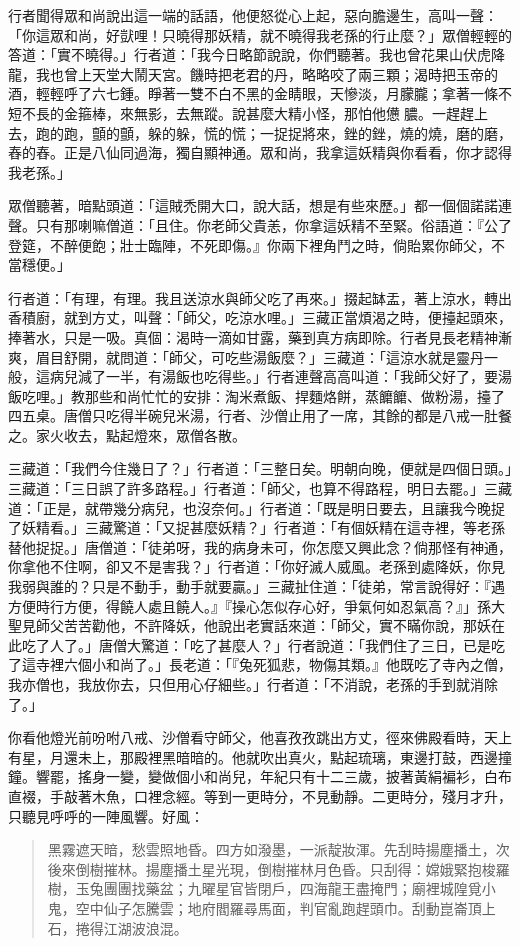 行者聞得眾和尚說出這一端的話語，他便怒從心上起，惡向膽邊生，高叫一聲：「你這眾和尚，好獃哩！只曉得那妖精，就不曉得我老孫的行止麼？」眾僧輕輕的答道：「實不曉得。」行者道：「我今日略節說說，你們聽著。我也曾花果山伏虎降龍，我也曾上天堂大鬧天宮。饑時把老君的丹，略略咬了兩三顆；渴時把玉帝的酒，輕輕呼了六七鍾。睜著一雙不白不黑的金睛眼，天慘淡，月朦朧；拿著一條不短不長的金箍棒，來無影，去無蹤。說甚麼大精小怪，那怕他憊𪬯膿。一趕趕上去，跑的跑，顫的顫，躲的躲，慌的慌；一捉捉將來，銼的銼，燒的燒，磨的磨，舂的舂。正是八仙同過海，獨自顯神通。眾和尚，我拿這妖精與你看看，你才認得我老孫。」

眾僧聽著，暗點頭道：「這賊禿開大口，說大話，想是有些來歷。」都一個個諾諾連聲。只有那喇嘛僧道：「且住。你老師父貴恙，你拿這妖精不至緊。俗語道：『公了登筵，不醉便飽；壯士臨陣，不死即傷。』你兩下裡角鬥之時，倘貽累你師父，不當穩便。」

行者道：「有理，有理。我且送涼水與師父吃了再來。」掇起缽盂，著上涼水，轉出香積廚，就到方丈，叫聲：「師父，吃涼水哩。」三藏正當煩渴之時，便擡起頭來，捧著水，只是一吸。真個：渴時一滴如甘露，藥到真方病即除。行者見長老精神漸爽，眉目舒開，就問道：「師父，可吃些湯飯麼？」三藏道：「這涼水就是靈丹一般，這病兒減了一半，有湯飯也吃得些。」行者連聲高高叫道：「我師父好了，要湯飯吃哩。」教那些和尚忙忙的安排：淘米煮飯、捍麵烙餅，蒸饝饝、做粉湯，擡了四五桌。唐僧只吃得半碗兒米湯，行者、沙僧止用了一席，其餘的都是八戒一肚餐之。家火收去，點起燈來，眾僧各散。

三藏道：「我們今住幾日了？」行者道：「三整日矣。明朝向晚，便就是四個日頭。」三藏道：「三日誤了許多路程。」行者道：「師父，也算不得路程，明日去罷。」三藏道：「正是，就帶幾分病兒，也沒奈何。」行者道：「既是明日要去，且讓我今晚捉了妖精看。」三藏驚道：「又捉甚麼妖精？」行者道：「有個妖精在這寺裡，等老孫替他捉捉。」唐僧道：「徒弟呀，我的病身未可，你怎麼又興此念？倘那怪有神通，你拿他不住啊，卻又不是害我？」行者道：「你好滅人威風。老孫到處降妖，你見我弱與誰的？只是不動手，動手就要贏。」三藏扯住道：「徒弟，常言說得好：『遇方便時行方便，得饒人處且饒人。』『操心怎似存心好，爭氣何如忍氣高？』」孫大聖見師父苦苦勸他，不許降妖，他說出老實話來道：「師父，實不瞞你說，那妖在此吃了人了。」唐僧大驚道：「吃了甚麼人？」行者說道：「我們住了三日，已是吃了這寺裡六個小和尚了。」長老道：「『兔死狐悲，物傷其類。』他既吃了寺內之僧，我亦僧也，我放你去，只但用心仔細些。」行者道：「不消說，老孫的手到就消除了。」

你看他燈光前吩咐八戒、沙僧看守師父，他喜孜孜跳出方丈，徑來佛殿看時，天上有星，月還未上，那殿裡黑暗暗的。他就吹出真火，點起琉璃，東邊打鼓，西邊撞鐘。響罷，搖身一變，變做個小和尚兒，年紀只有十二三歲，披著黃絹褊衫，白布直裰，手敲著木魚，口裡念經。等到一更時分，不見動靜。二更時分，殘月才升，只聽見呼呼的一陣風響。好風：
\begin{quote}
黑霧遮天暗，愁雲照地昏。四方如潑墨，一派靛妝渾。先刮時揚塵播土，次後來倒樹摧林。揚塵播土星光現，倒樹摧林月色昏。只刮得：嫦娥緊抱梭羅樹，玉兔團團找藥盆；九曜星官皆閉戶，四海龍王盡掩門；廟裡城隍覓小鬼，空中仙子怎騰雲；地府閻羅尋馬面，判官亂跑趕頭巾。刮動崑崙頂上石，捲得江湖波浪混。
\end{quote}

